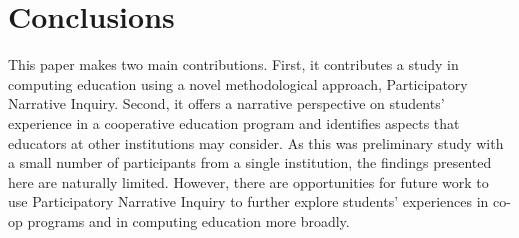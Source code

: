 \documentclass{article}
\begin{document}
\section{Conclusions}
This paper makes two main contributions. First, it contributes a study in computing education using a novel methodological approach, Participatory Narrative Inquiry. Second, it offers a narrative perspective on students’ experience in a cooperative education program and identifies aspects that educators at other institutions may consider. As this was preliminary study with a small number of participants from a single institution, the findings presented here are naturally limited. However, there are opportunities for future work to use Participatory Narrative Inquiry to further explore students’ experiences in co-op programs and in computing education more broadly.


\clearpage

\renewcommand*{\bibfont}{\fontsize{10}{10}\selectfont}
\printbibliography
\end{document}

